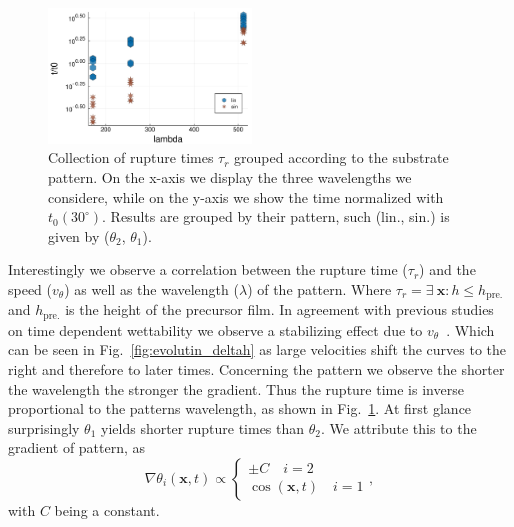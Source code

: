 \documentclass[twocolumn,amsmath,amssymb,showpacs,pre,nofootinbib,superscriptaddress]{revtex4-1} %
\begin{document}
\begin{figure}
    \centering
    \includegraphics[width=0.48\textwidth]{Figures/Rupture_times.pdf}
    \caption{Collection of rupture times $\tau_r$ grouped according to the substrate pattern.
    On the x-axis we display the three wavelengths we considere, while on the y-axis we show the time normalized with $t_0(30^{\circ})$.
    Results are grouped by their pattern, such (lin., sin.) is given by ($\theta_2$, $\theta_1$).
    }
    \label{fig:rupture_times}
\end{figure}
Interestingly we observe a correlation between the rupture time ($\tau_r$) and the speed ($v_{\theta}$) as well as the wavelength ($\lambda$) of the pattern.
Where $\tau_r =\exists~\mathbf{x}:h \le h_{\text{pre.}}$ and $h_{\text{pre.}}$ is the height of the precursor film.
In agreement with previous studies on time dependent wettability we observe a stabilizing effect due to $v_{\theta}$~\cite{suman2006dynamics}.
Which can be seen in Fig.~\ref{fig:evolutin_deltah} as large velocities shift the curves to the right and therefore to later times.
Concerning the pattern we observe the shorter the wavelength the stronger the gradient.
Thus the rupture time is inverse proportional to the patterns wavelength, as shown in Fig.~\ref{fig:rupture_times}.
At first glance surprisingly $\theta_1$ yields shorter rupture times than $\theta_2$.
We attribute this to the gradient of pattern, as  
\begin{equation}\label{eq:grad_theta}
    \nabla\theta_i(\mathbf{x},t) \propto \begin{cases}
    \pm C \quad i=2 \\
    \cos(\mathbf{x},t) \quad i=1
    \end{cases},
\end{equation}
with $C$ being a constant.
\end{document}
